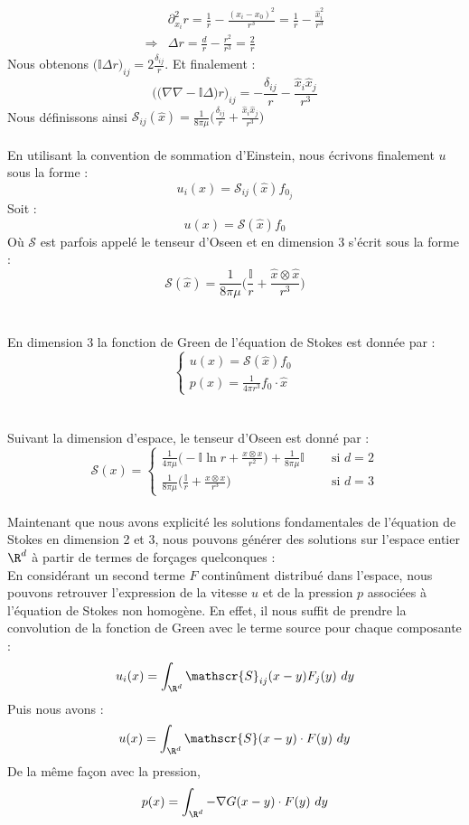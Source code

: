 \begin{align*}
    &\partial_{x_i}^2 r = \frac{1}{r} - \frac{(x_i - x_0)^2}{r^3} = \frac{1}{r} - \frac{\hat{x}_i^2}{r^3} \\
    \Rightarrow &\Delta r = \frac{d}{r} - \frac{r^2}{r^3} = \frac{2}{r} 
\end{align*}
Nous obtenons  $\displaystyle \big(\mathbb{I}\Delta r\big)_{ij} = 2 \frac{\delta_{ij}}{r} $.
Et finalement :
$$ \Big( \big(\nabla \nabla - \mathbb{I}\Delta\big)r \Big)_{ij} = - \frac{\delta_{ij}}{r} - \frac{\hat{x}_i\hat{x}_j}{r^3} $$
Nous définissons ainsi $\displaystyle \mathscr{S}_{ij}(\hat{x}) = \frac{1}{8\pi \mu}\bigg(\frac{\delta_{ij}}{r} + \frac{\hat{x}_i\hat{x}_j}{r^3} \bigg) $\\
\\
En utilisant la convention de sommation d'Einstein, nous écrivons finalement $u$ sous la forme :
$$u_i(x) = \mathscr{S}_{ij}(\hat{x}) f_{0_{j}}$$
Soit :
$$u(x) = \mathscr{S}(\hat{x})f_0 $$
Où $\mathscr{S}$ est parfois appelé le tenseur d'Oseen et en dimension 3 s'écrit sous la forme :
$$\mathscr{S}(\hat{x}) = \frac{1}{8\pi \mu} \bigg( \frac{\mathbb{I}}{r} + \frac{\hat{x} \otimes \hat{x}}{r^3} \bigg) $$\\
\\
En dimension $3$ la fonction de Green de l'équation de Stokes est donnée par :
$$\begin{cases}
    u(x) = \mathscr{S}(\hat{x})f_0 \\
    \displaystyle p(x) = \frac{1}{4\pi r^3} f_0 \cdot \hat{x}
\end{cases}$$\\
\\
Suivant la dimension d'espace, le tenseur d'Oseen est donné par :
$$\mathscr{S}(x) = \begin{cases}
    \displaystyle \frac{1}{4\pi\mu}\Big( - \mathbb{I}\ln r + \frac{x \otimes x}{r^2} \Big) + \frac{1}{8\pi\mu}\mathbb{I} \quad &\text{ si } d = 2 \\
    \displaystyle \frac{1}{8\pi\mu}\Big( \frac{\mathbb{I}}{r} + \frac{x \otimes x}{r^3} \Big) &\text{ si } d = 3
\end{cases}$$
\\
Maintenant que nous avons explicité les solutions fondamentales de l'équation de Stokes en dimension 2 et 3, nous pouvons générer des solutions sur l'espace entier $\R^d$ à partir de termes de forçages quelconques :\\
En considérant un second terme $F$ continûment distribué dans l'espace, nous pouvons retrouver l'expression de la vitesse $u$ et de la pression $p$ associées à l'équation de Stokes non homogène.
En effet, il nous suffit de prendre la convolution de la fonction de Green avec le terme source pour chaque composante :
$$u_i(x) = \int_{\R^d} \mathscr{S}_{ij}(x - y) F_j(y) \ dy $$
Puis nous avons :
$$u(x) = \int_{\R^d} \mathscr{S}(x - y) \cdot F(y) \ dy $$
De la même façon avec la pression, 
$$ p(x) = \int_{\R^d} - \nabla G(x - y) \cdot F(y) \ dy $$
